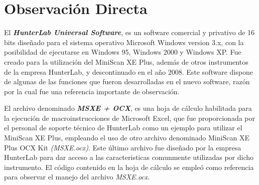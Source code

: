 	\section{Observaci\'{o}n Directa}
		
			El \textbf{\textit{HunterLab Universal Software}}, es un software comercial y privativo de 16 bits dise\~{n}ado para el sistema operativo Microsoft Windows version 3.x, con la posibilidad de ejecutarse en Windows 95, Windows 2000 y Windows XP. Fue creado para la utilizaci\'{o}n del MiniScan XE Plus, adem\'{a}s de otros instrumentos de la empresa HunterLab, y descontinuado en el a\~{n}o 2008. Este software dispone de algunas de las funciones que fueron desarrolladas en el nuevo software, raz\'{o}n por la cual fue una referencia importante de observaci\'{o}n.

			El archivo denominado \textbf{\textit{MSXE + OCX}}, es una hoja de c\'{a}lculo habilitada para la ejecuci\'{o}n de macroinstrucciones de Microsoft Excel, que fue proporcionada por el personal de soporte t\'{e}cnico de HunterLab como un ejemplo para utilizar el MiniScan XE Plus, empleando el uso de otro archivo denominado MiniScan XE Plus OCX Kit \textit{(MSXE.ocx)}. Este \'{u}ltimo archivo fue dise\~{n}ado por la empresa HunterLab para dar acceso a las caracteristicas comunmente utilizadas por dicho instrumento. El c\'{o}digo contenido en la hoja de c\'{a}lculo se emple\'{o} como referencia para observar el manejo del archivo \textit{MSXE.ocx}.

		